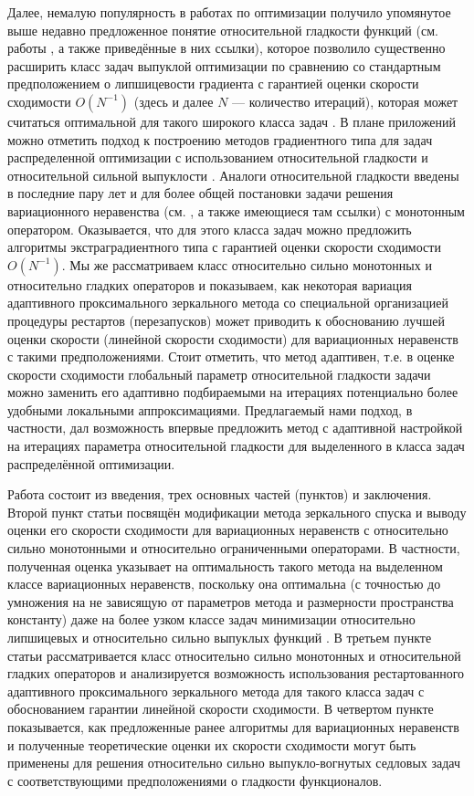     Далее, немалую популярность в работах по оптимизации получило упомянутое выше недавно предложенное понятие относительной гладкости функций (см. работы \cite{Bauschke,Drag,Dragomir,Lu_Nesterov_2018}, а также приведённые в них ссылки), которое позволило существенно расширить класс задач выпуклой оптимизации по сравнению со стандартным предположением о липшицевости градиента с гарантией оценки скорости сходимости $O(N^{-1})$ (здесь и далее $N$ --- количество итераций), которая может считаться оптимальной для такого широкого класса задач \cite{Dragomir}. В плане приложений можно отметить подход к построению методов градиентного типа для задач распределенной оптимизации с использованием относительной гладкости и относительной сильной выпуклости \cite{Hendr}. Аналоги относительной гладкости введены в последние пару лет и для более общей постановки задачи решения вариационного неравенства (см. \cite{Inex}, а также имеющиеся там ссылки) с монотонным оператором. Оказывается, что для этого класса задач можно предложить алгоритмы экстраградиентного типа с гарантией оценки скорости сходимости $O(N^{-1})$. Мы же рассматриваем класс относительно сильно монотонных и относительно гладких операторов и показываем, как некоторая вариация адаптивного проксимального зеркального метода \cite{UMP} со специальной организацией процедуры рестартов (перезапусков) может приводить к обоснованию лучшей оценки скорости (линейной скорости сходимости) для вариационных неравенств с такими предположениями. Стоит отметить, что метод адаптивен, т.е. в оценке скорости сходимости глобальный параметр относительной гладкости задачи можно заменить его адаптивно подбираемыми на итерациях потенциально более удобными локальными аппроксимациями. Предлагаемый нами подход, в частности, дал возможность впервые предложить метод с адаптивной настройкой на итерациях параметра относительной гладкости для выделенного в \cite{Hendr} класса задач распределённой оптимизации.

    Работа состоит из введения, трех основных частей (пунктов) и заключения. Второй пункт статьи посвящён модификации метода зеркального спуска и выводу оценки его скорости сходимости для вариационных неравенств с относительно сильно монотонными и относительно ограниченными операторами. В частности, полученная оценка указывает на оптимальность такого метода на выделенном классе вариационных неравенств, поскольку она оптимальна (с точностью до умножения на не зависящую от параметров метода и размерности пространства константу) даже на более узком классе задач минимизации относительно липшицевых и относительно сильно выпуклых функций \cite{Lu_2018}. В третьем пункте статьи рассматривается класс относительно сильно монотонных и относительной гладких операторов и анализируется возможность использования рестартованного адаптивного проксимального зеркального метода для такого класса задач с обоснованием гарантии линейной скорости сходимости. В четвертом пункте показывается, как предложенные ранее алгоритмы для вариационных неравенств и полученные теоретические оценки их скорости сходимости могут быть применены для решения относительно сильно выпукло-вогнутых седловых задач с соответствующими предположениями о гладкости функционалов.

